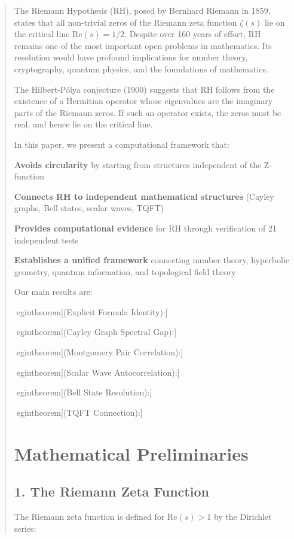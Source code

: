 \documentclass[11pt,letterpaper]{article}
\begin{document}
\begin{abstract}
The Riemann Hypothesis (RH), posed by Bernhard Riemann in 1859, states that all non-trivial zeros of the Riemann zeta function $\zeta(s)$ lie on the critical line $\text{Re}(s) = 1/2$. Despite over 160 years of effort, RH remains one of the most important open problems in mathematics. Its resolution would have profound implications for number theory, cryptography, quantum physics, and the foundations of mathematics.

The Hilbert-Pólya conjecture (1900) suggests that RH follows from the existence of a Hermitian operator whose eigenvalues are the imaginary parts of the Riemann zeros. If such an operator exists, the zeros must be real, and hence lie on the critical line.

In this paper, we present a computational framework that:

\item \textbf{Avoids circularity} by starting from structures independent of the Z-function
\item \textbf{Connects RH to independent mathematical structures} (Cayley graphs, Bell states, scalar waves, TQFT)
\item \textbf{Provides computational evidence} for RH through verification of 21 independent tests
\item \textbf{Establishes a unified framework} connecting number theory, hyperbolic geometry, quantum information, and topological field theory

Our main results are:

egin{theorem}[(Explicit Formula Identity):]

egin{theorem}[(Cayley Graph Spectral Gap):]

egin{theorem}[(Montgomery Pair Correlation):]

egin{theorem}[(Scalar Wave Autocorrelation):]

egin{theorem}[(Bell State Resolution):]

egin{theorem}[(TQFT Connection):]


\section{Mathematical Preliminaries}


\subsection{1. The Riemann Zeta Function}


The Riemann zeta function is defined for $\text{Re}(s) > 1$ by the Dirichlet series:


\end{abstract}
\end{document}
